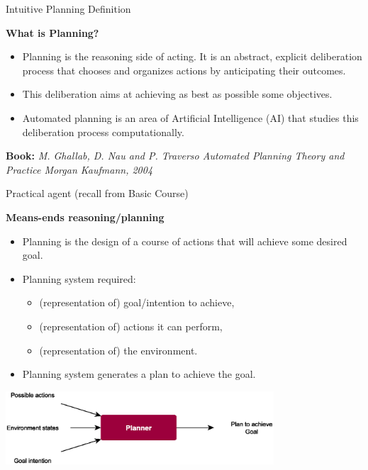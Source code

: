 \documentclass[9pt]{beamer}
\begin{document}
\begin{frame}{Intuitive Planning Definition}
\begin{small}

\textbf{What is Planning?}\\
\begin{itemize}
\item Planning is the \textcolor{CS-1light}{reasoning side of acting}. It is an abstract, explicit deliberation process that chooses and organizes actions by anticipating their outcomes.
\item This deliberation aims at achieving \textcolor{CS-1light}{as best as possible} some objectives.
\item Automated planning is an area of Artificial Intelligence (AI) that studies this deliberation process computationally.
\end{itemize}

\textbf{Book:} \emph{M. Ghallab, D. Nau and P. Traverso Automated Planning Theory and Practice Morgan Kaufmann, 2004}

\end{small}
\end{frame}

\begin{frame}{Practical agent (recall from Basic Course)}
\begin{small}

\textbf{Means-ends reasoning/planning}\\
\begin{itemize}
\item Planning is the design of a course of actions that will achieve some desired goal.
\item Planning system required:
\begin{itemize}
\item (representation of) goal/intention to achieve,
\item (representation of) actions it can perform,
\item (representation of) the environment.
\end{itemize}
\item Planning system generates a plan to achieve the goal.
\end{itemize}

\begin{center}
\includegraphics[keepaspectratio, width=0.75\textwidth]{images/planning.eps}
\end{center}
\end{small}
\end{frame}
\end{document}
